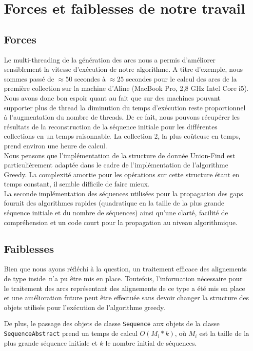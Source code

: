 
\section{Forces et faiblesses de notre travail}

\subsection{Forces}

Le multi-threading de la génération des arcs nous a permis d'améliorer sensiblement la vitesse d'exécution de notre algorithme. A titre d'exemple, nous sommes passé de $\approx 50$ secondes à $\approx 25$ secondes pour le calcul des arcs de la première collection sur la machine d'Aline (MacBook Pro, 2,8 GHz Intel Core i5). Nous avons donc bon espoir quant au fait que sur des machines pouvant supporter plus de thread la diminution du temps d'exécution reste proportionnel à l'augmentation du nombre de threads. De ce fait, nous pouvons récupérer les résultats de la reconstruction de la séquence initiale pour les différentes collections en un temps raisonnable. La collection 2, la plus coûteuse en temps, prend environ une heure de calcul.\\

Nous pensons que l'implémentation de la structure de donnée Union-Find est particulièrement adaptée dans le cadre de l'implémentation de l'algorithme Greedy. La complexité amortie pour les opérations sur cette structure étant en temps constant, il semble difficile de faire mieux.\\

La seconde implémentation des séquences utilisées pour la propagation des gaps
fournit des algorithmes rapides (quadratique en la taille de la plus grande séquence initiale et
du nombre de séquences) ainsi qu'une clarté, facilité de compréhension et un
code court pour la propagation au niveau algorithmique.


\subsection{Faiblesses}

Bien que nous ayons réfléchi à la question, un traitement efficace des alignements de type \og inside\fg~n'a pu être mis en place. Toutefois, l'information nécessaire pour le traitement des arcs représentant des alignements de ce type a été mis en place et une amélioration future peut être effectuée sans devoir changer la structure des objets utilisés pour l'exécution de l'algorithme greedy.

De plus, le passage des objets de classe \verb|Sequence| aux objets de la classe
\verb|SequenceAbstract| prend un temps de calcul $O(M_{i} * k)$, où $M_{i}$ est
la taille de la plus grande séquence initiale et $k$ le nombre initial de
séquences.

